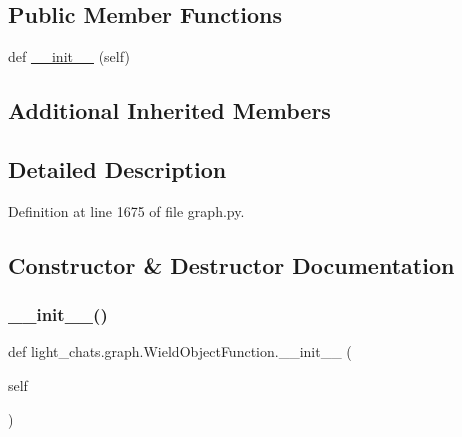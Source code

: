 \subsection*{Public Member Functions}
\begin{DoxyCompactItemize}
\item 
def \hyperlink{classlight__chats_1_1graph_1_1WieldObjectFunction_ae69815477d6c421c497848881eecf124}{\+\_\+\+\_\+init\+\_\+\+\_\+} (self)
\end{DoxyCompactItemize}
\subsection*{Additional Inherited Members}


\subsection{Detailed Description}
\begin{DoxyVerb}
\end{DoxyVerb}
 

Definition at line 1675 of file graph.\+py.



\subsection{Constructor \& Destructor Documentation}
\mbox{\label{classlight__chats_1_1graph_1_1WieldObjectFunction_ae69815477d6c421c497848881eecf124}} 
\subsubsection{\texorpdfstring{\+\_\+\+\_\+init\+\_\+\+\_\+()}{\_\_init\_\_()}}
{\footnotesize\ttfamily def light\+\_\+chats.\+graph.\+Wield\+Object\+Function.\+\_\+\+\_\+init\+\_\+\+\_\+ (\begin{DoxyParamCaption}\item[{}]{self }\end{DoxyParamCaption})}



